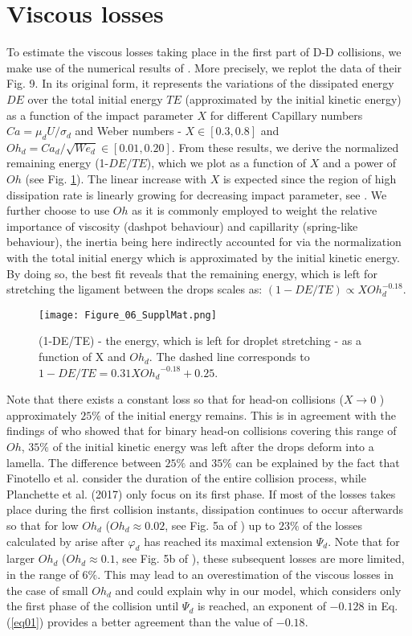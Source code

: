 \documentclass{article}
\begin{document}
{\section{Viscous losses}}\label{appF}

To estimate the viscous losses taking place in the first part of D-D collisions, we make use of the numerical results of \cite{ref:Finotello2017}. More precisely, we replot the data of their Fig. 9. In its original form, it represents the variations of the dissipated energy $DE$ over the total initial energy $TE$ (approximated by the initial kinetic energy) as a function of the impact parameter $X$ for different Capillary numbers $Ca=\mu_dU/\sigma_d$ and Weber numbers - $X \in [0.3, 0.8]$ and $Oh_d=Ca_d/\sqrt{We_d} \in [0.01, 0.20]$. From these results, we derive the normalized remaining energy (1-$DE/TE$), which we plot  as a function of $X$ and a power of $Oh$ (see Fig. \ref{app_fig06}). The linear increase with $X$ is expected since the region of high dissipation rate is linearly growing for decreasing impact parameter, see \cite{ref:Finotello2017}.
We further choose to use  $Oh$ as it is commonly employed to weight the relative importance of viscosity {(dashpot behaviour)} and capillarity {(spring-like behaviour)}, the inertia being here indirectly accounted for via the normalization with the total initial energy which is approximated by the initial kinetic energy.  By doing so, the best fit reveals that the remaining energy, which is left for stretching the ligament between the drops scales as: $(1-DE/TE) \propto  X Oh_d^{-0.18}$. 
\begin{figure}
\centering
\texttt{[image: Figure\_06\_SupplMat.png]}
\caption{\label{app_fig06} (1-DE/TE) - the energy, which is left for droplet stretching - as a function of X and $Oh_d$. The dashed line corresponds to $1-DE/TE=0.31X{Oh_d}^{-0.18}+0.25$.}
\end{figure}
Note that there exists a constant loss so that for head-on collisions ($X \rightarrow 0$ ) approximately $25\%$ of the initial energy remains. This  is in agreement with the findings of \cite{ref:Planchette2017} who showed that for binary head-on collisions covering this range of $Oh$,  $35\%$ of the initial kinetic energy was left after the  drops deform into a lamella. The difference between $25\%$ and $35\%$ can be explained by the fact that Finotello et al. consider the duration of the entire collision process, while Planchette et al. (2017) only focus on its first phase. If most of the losses takes place during the first collision instants, dissipation continues to occur afterwards so that for low $Oh_d$ ($Oh_d \approx 0.02$, see Fig. 5a of \citep{ref:Finotello2017}) up to $23\%$ of the losses calculated by \cite{ref:Finotello2017} arise after $\varphi_d$ has reached its maximal extension $\Psi_d$. Note that for larger $Oh_d$ ($Oh_d \approx 0.1$, see Fig. 5b of \cite{ref:Finotello2017}), these subsequent losses are more limited, in the range of $6\%$. This may lead to an overestimation of the viscous losses in the case of small $Oh_d$ and could explain why in our model, which considers only the first phase of the collision until $\Psi_d$ is reached,  an exponent of $-0.128$ in Eq. (\ref{eq01}) provides a better agreement than the value of $-0.18$.
\end{document}
